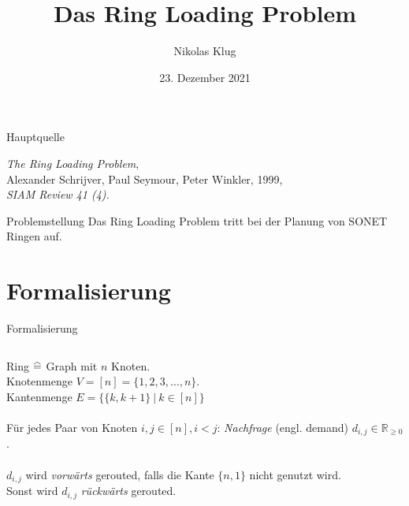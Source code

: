 \documentclass[8pt]{beamer}
\title[]{Das Ring Loading Problem}
\author[Nikolas Klug]{Nikolas Klug}
\institute[Universität Augsburg]{Universität Augsburg}
\date{23. Dezember 2021}
\newcommand{\R}{\mathbb{R}}
\newcommand\equalhat{\mathrel{\stackon[1.5pt]{=}{\stretchto{%
				\scalerel*[\widthof{=}]{\wedge}{\rule{1ex}{3ex}}}{0.5ex}}}}
\theoremstyle{claim}
\begin{document}
	{
	\begin{frame}
		\titlepage
	\end{frame}
	}
	\addtocounter{framenumber}{-1}

	\begin{frame}{Hauptquelle}

		\emph{The Ring Loading Problem},\\
		 Alexander Schrijver, Paul Seymour, Peter Winkler, 1999,\\
		 \emph{SIAM Review 41 (4).}\\
	\end{frame}
	
	\begin{frame}{Problemstellung}
		Das Ring Loading Problem tritt bei der Planung von SONET Ringen auf.
		
	\end{frame}

	\section{Formalisierung}
	
	\begin{frame}{Formalisierung}
		\begin{columns}
			\column{0.6\linewidth}
			Ring $\equalhat$ Graph mit $n$ Knoten.\\
			Knotenmenge $V = [n] = \{1, 2, 3, \dots, n\}$.\\
			Kantenmenge $E = \{\{k, k+1\}\ |\ k \in [n]\}$\\
			~\\\pause
			Für jedes Paar von Knoten $i, j \in [n], i < j$: \emph{Nachfrage} (engl. demand) $d_{i, j} \in \R_{\geq 0}$.\\
			~\\\pause
			$d_{i,j}$ wird \emph{vorwärts} gerouted, falls die Kante $\{n, 1\}$ nicht genutzt wird.\\
			Sonst wird $d_{i,j}$ \emph{rückwärts} gerouted.
			\column{0.4\linewidth}
			
		\end{columns} 
	\end{frame}
	
\end{document}
